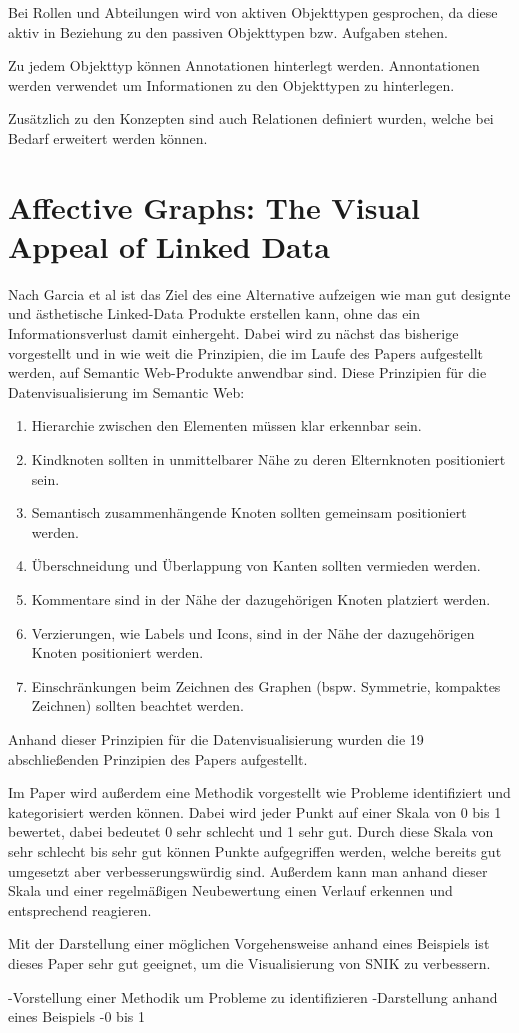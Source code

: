 Bei Rollen und Abteilungen wird von aktiven Objekttypen gesprochen, da diese aktiv in Beziehung zu den passiven Objekttypen bzw. Aufgaben stehen.\cite{Schaaf.}

Zu jedem Objekttyp können Annotationen hinterlegt werden. 
Annontationen werden verwendet um Informationen zu den Objekttypen zu hinterlegen.\cite{Schaaf.}

Zusätzlich zu den Konzepten sind auch Relationen definiert wurden, welche bei Bedarf erweitert werden können.\cite{Schaaf.}
\section{Affective Graphs: The Visual Appeal of Linked Data}
Nach Garcia et al ist das Ziel des eine Alternative aufzeigen wie man gut designte und ästhetische Linked-Data Produkte erstellen kann, ohne das ein Informationsverlust damit einhergeht.
Dabei wird zu nächst das bisherige vorgestellt und in wie weit die Prinzipien, die im Laufe des Papers aufgestellt werden, auf Semantic Web-Produkte anwendbar sind.\cite[S. 2]{Garcia.}
Diese Prinzipien für die Datenvisualisierung im Semantic Web:
\begin{enumerate}
	\item Hierarchie zwischen den Elementen müssen klar erkennbar sein.
	\item Kindknoten sollten in unmittelbarer Nähe zu deren Elternknoten positioniert sein.
	\item Semantisch zusammenhängende Knoten sollten gemeinsam positioniert werden.
	\item Überschneidung und Überlappung von Kanten sollten vermieden werden.
	\item Kommentare sind in der Nähe der dazugehörigen Knoten platziert werden.
	\item Verzierungen, wie Labels und Icons, sind in der Nähe der dazugehörigen Knoten positioniert werden.
	\item Einschränkungen beim Zeichnen des Graphen (bspw. Symmetrie, kompaktes Zeichnen) sollten beachtet werden.
\end{enumerate}

Anhand dieser Prinzipien für die Datenvisualisierung wurden die 19 abschließenden Prinzipien des Papers aufgestellt. 


Im Paper wird außerdem eine Methodik vorgestellt wie Probleme identifiziert und kategorisiert werden können. 
Dabei wird jeder Punkt auf einer Skala von 0 bis 1 bewertet, dabei bedeutet 0 sehr schlecht und 1 sehr gut.
Durch diese Skala von sehr schlecht bis sehr gut können Punkte aufgegriffen werden, welche bereits gut umgesetzt aber verbesserungswürdig sind. 
Außerdem kann man anhand dieser Skala und einer regelmäßigen Neubewertung einen Verlauf erkennen und entsprechend reagieren.

Mit der Darstellung einer möglichen Vorgehensweise anhand eines Beispiels ist dieses Paper sehr gut geeignet, um die Visualisierung von \ac{SNIK} zu verbessern. 


-Vorstellung einer Methodik um Probleme zu identifizieren
-Darstellung anhand eines Beispiels
-0 bis 1 
